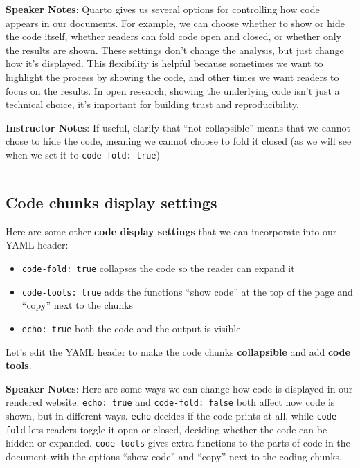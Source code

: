 \documentclass[
  letterpaper,
  DIV=11,
  numbers=noendperiod]{scrartcl}
\providecommand{\tightlist}{%
  \setlength{\itemsep}{0pt}\setlength{\parskip}{0pt}}
\begin{document}
\textbf{Speaker Notes}: Quarto gives us several options for controlling
how code appears in our documents. For example, we can choose whether to
show or hide the code itself, whether readers can fold code open and
closed, or whether only the results are shown. These settings don't
change the analysis, but just change how it's displayed. This
flexibility is helpful because sometimes we want to highlight the
process by showing the code, and other times we want readers to focus on
the results. In open research, showing the underlying code isn't just a
technical choice, it's important for building trust and reproducibility.

\textbf{Instructor Notes}: If useful, clarify that ``not collapsible''
means that we cannot chose to hide the code, meaning we cannot choose to
fold it closed (as we will see when we set it to
\texttt{code-fold:\ true})

\begin{center}\rule{0.5\linewidth}{0.5pt}\end{center}

\subsection{Code chunks display
settings}\label{code-chunks-display-settings}

Here are some other \textbf{code display settings} that we can
incorporate into our YAML header:

\begin{itemize}
\tightlist
\item
  \texttt{code-fold:\ true} collapses the code so the reader can expand
  it
\item
  \texttt{code-tools:\ true} adds the functions ``show code'' at the top
  of the page and ``copy'' next to the chunks
\item
  \texttt{echo:\ true} both the code and the output is visible
\end{itemize}

Let's edit the YAML header to make the code chunks \textbf{collapsible}
and add \textbf{code tools}.

\textbf{Speaker Notes}: Here are some ways we can change how code is
displayed in our rendered website. \texttt{echo:\ true} and
\texttt{code-fold:\ false} both affect how code is shown, but in
different ways. \texttt{echo} decides if the code prints at all, while
\texttt{code-fold} lets readers toggle it open or closed, deciding
whether the code can be hidden or expanded. \texttt{code-tools} gives
extra functions to the parts of code in the document with the options
``show code'' and ``copy'' next to the coding chunks.
\end{document}

